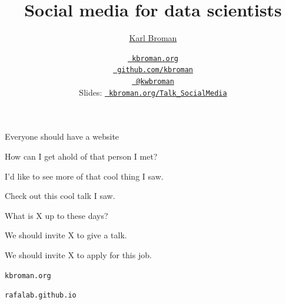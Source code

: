 \documentclass[12pt,t,aspectratio=169]{beamer}
\title{Social media for data scientists}
\subtitle{}
\author{\href{https://kbroman.org}{Karl Broman}}
\institute{Biostatistics \& Medical Informatics, UW{\textendash}Madison}
\date{\href{https://kbroman.org}{\tt \scriptsize \color{foreground} kbroman.org}
\\[-4pt]
\href{https://github.com/kbroman}{\tt \scriptsize \color{foreground} github.com/kbroman}
\\[-4pt]
\href{https://twitter.com/kwbroman}{\tt \scriptsize \color{foreground} @kwbroman}
\\[2pt]
\scriptsize {\lolit Slides:} \href{https://kbroman.org/Talk\_SocialMedia}{\tt \scriptsize
  \color{foreground} kbroman.org/Talk\_SocialMedia}
}
\begin{document}
{
 }





{

\begin{frame}[c]{}

\centerline{
\color{background}
  \Large Everyone should have a website
}


\end{frame}
}


\begin{frame}[c]{}

  \bbi
\item How can I get ahold of that person I met?
\item I'd like to see more of that cool thing I saw.
\item Check out this cool talk I saw.
\item What is X up to these days?
\item We should invite X to give a talk.
\item We should invite X to apply for this job.
  \ei

\end{frame}


\begin{frame}[c]{}
  \href{https://kbroman.org}{}

\vfill \hfill {\tt \small \lolit kbroman.org}
\end{frame}

\begin{frame}[c]{}
\addtocounter{framenumber}{-1}
  \href{https://rafalab.github.io}{}

\vfill \hfill {\tt \small \lolit rafalab.github.io}
\end{frame}
\end{document}
